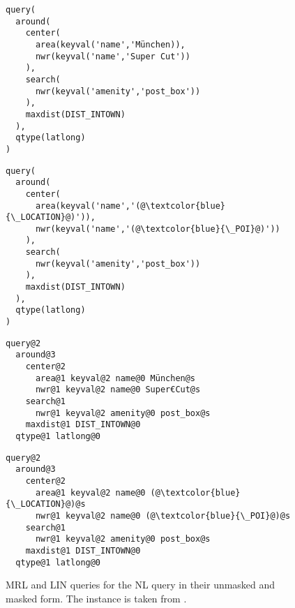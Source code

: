 \begin{figure}[h]
  \centering
    \begin{minipage}{0.48\textwidth}
      \begin{lstlisting}[style=MyMRL,title={Unmasked MRL},basicstyle={\ttfamily\scriptsize}]
query(
  around(
    center(
      area(keyval('name','München)),
      nwr(keyval('name','Super Cut'))
    ),
    search(
      nwr(keyval('amenity','post_box'))
    ),
    maxdist(DIST_INTOWN)
  ),
  qtype(latlong)
)
      \end{lstlisting}
    \end{minipage}
    \hfill
    \begin{minipage}{0.48\textwidth}
      \begin{lstlisting}[style=MyMRL,title={Masked MRL},basicstyle={\ttfamily\scriptsize{}}]
query(
  around(
    center(
      area(keyval('name','(@\textcolor{blue}{\_LOCATION}@)')),
      nwr(keyval('name','(@\textcolor{blue}{\_POI}@)'))
    ),
    search(
      nwr(keyval('amenity','post_box'))
    ),
    maxdist(DIST_INTOWN)
  ),
  qtype(latlong)
)
      \end{lstlisting}
    \end{minipage}
    \begin{minipage}{0.48\textwidth}
      \begin{lstlisting}[style=MyLin,title={Unmasked LIN},basicstyle={\ttfamily\scriptsize}]
query@2
  around@3
    center@2
      area@1 keyval@2 name@0 München@s
      nwr@1 keyval@2 name@0 Super€Cut@s
    search@1
      nwr@1 keyval@2 amenity@0 post_box@s
    maxdist@1 DIST_INTOWN@0
  qtype@1 latlong@0
      \end{lstlisting}
    \end{minipage}
    \hfill
    \begin{minipage}{0.48\textwidth}
      \begin{lstlisting}[style=MyLin,title={Masked LIN},basicstyle={\ttfamily\scriptsize{}}]
query@2
  around@3
    center@2
      area@1 keyval@2 name@0 (@\textcolor{blue}{\_LOCATION}@)@s
      nwr@1 keyval@2 name@0 (@\textcolor{blue}{\_POI}@)@s
    search@1
      nwr@1 keyval@2 amenity@0 post_box@s
    maxdist@1 DIST_INTOWN@0
  qtype@1 latlong@0
      \end{lstlisting}
    \end{minipage}
    \caption[\nlmapstwo{} query variants]{MRL and LIN queries for the NL query
       in their unmasked and
      masked form. The instance is taken from \nlmapstwo{}.}
  \label{fig:nlmaps-v2-query-variants}
\end{figure}

